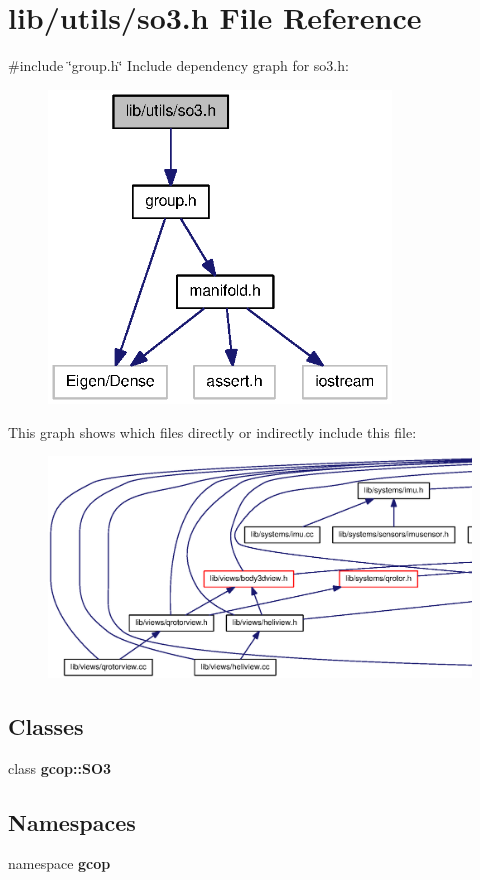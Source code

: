 \section{lib/utils/so3.h \-File \-Reference}
\label{so3_8h}
{\ttfamily \#include \char`\"{}group.\-h\char`\"{}}\*
\-Include dependency graph for so3.\-h\-:
\nopagebreak
\begin{figure}[H]
\begin{center}
\leavevmode
\includegraphics[width=258pt]{so3_8h__incl}
\end{center}
\end{figure}
\-This graph shows which files directly or indirectly include this file\-:
\nopagebreak
\begin{figure}[H]
\begin{center}
\leavevmode
\includegraphics[width=350pt]{so3_8h__dep__incl}
\end{center}
\end{figure}
\subsection*{\-Classes}
\begin{DoxyCompactItemize}
\item 
class {\bf gcop\-::\-S\-O3}
\end{DoxyCompactItemize}
\subsection*{\-Namespaces}
\begin{DoxyCompactItemize}
\item 
namespace {\bf gcop}
\end{DoxyCompactItemize}
